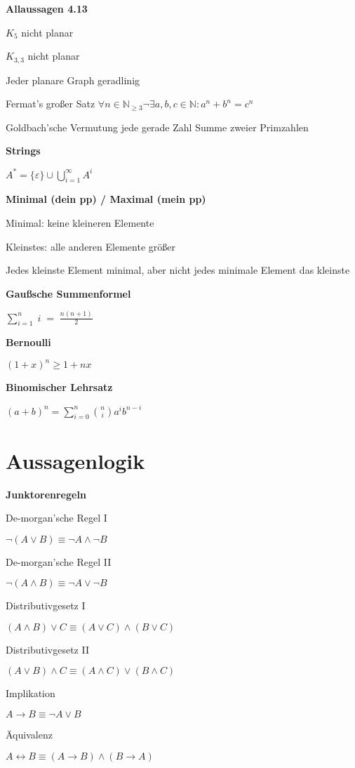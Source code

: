 \documentclass[a4paper,10pt]{article}
\newcommand{\N}{\mathbb{N}}
\begin{document}
\begin{multicols}{3}
\textbf{Allaussagen 4.13}

$K_5$ nicht planar

$K_{3,3}$ nicht planar

Jeder planare Graph geradlinig

Fermat's großer Satz $\forall n\in\N_{\ge 3} \neg \exists a,b,c\in\N: a^n + b^n = c^n$

Goldbach'sche Vermutung jede gerade Zahl Summe zweier Primzahlen

\textbf{Strings}

$A^* = \{\varepsilon\} \cup \bigcup_{i=1}^\infty A^i$

\textbf{Minimal (dein pp) / Maximal (mein pp)}

Minimal: keine kleineren Elemente

Kleinstes: alle anderen Elemente größer

Jedes kleinste Element minimal, aber nicht jedes minimale Element das kleinste

\textbf{Gaußsche Summenformel}

$\sum_{i=1}^n \; i \; = \; \frac{n(n+1)}{2}$

\textbf{Bernoulli}

$(1+x)^n \geq 1+nx$

\textbf{Binomischer Lehrsatz}

$(a+b)^n = \sum_{i=0}^n \binom{n}{i} a^i b^{n-i}$

\section{Aussagenlogik}

\textbf{Junktorenregeln}

De-morgan'sche Regel I

$\neg (A \vee B) \equiv \neg A \wedge \neg B$

De-morgan'sche Regel II

$\neg (A \wedge B) \equiv \neg A \vee \neg B$

Distributivgesetz I

$(A \wedge B)\vee C \equiv (A \vee C) \wedge (B \vee C)$

Distributivgesetz II

$(A \vee B)\wedge C \equiv (A \wedge C) \vee (B \wedge C)$

Implikation

$A\rightarrow B \equiv \neg A \vee B$

Äquivalenz

$A\leftrightarrow B \equiv (A \rightarrow B) \wedge (B \rightarrow A)$


\end{multicols}
\end{document}
